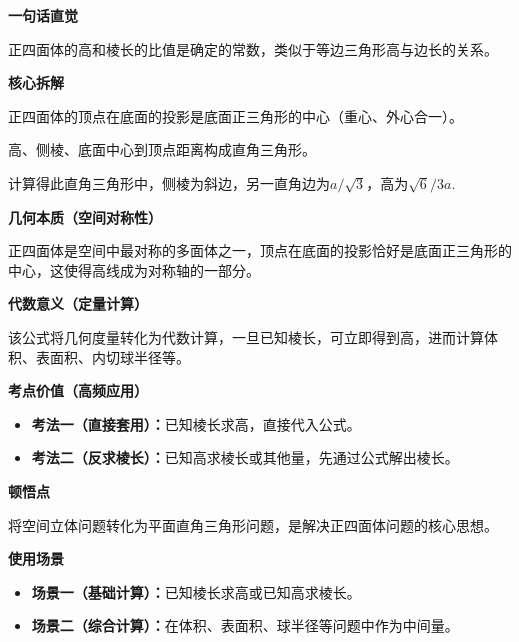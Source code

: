 \begin{explanationbox}
	\textbf{\textcolor{CExplanation}{一句话直觉}}

	正四面体的高和棱长的比值是确定的常数，类似于等边三角形高与边长的关系。

	\medskip
	\textbf{\textcolor{CExplanation}{核心拆解}}
	\begin{description}[style=nextline, leftmargin=2.8em, labelsep=0.5em, itemsep=0.45em]
		\item[\textbf{要点一（底面中心定位）：}]正四面体的顶点在底面的投影是底面正三角形的中心（重心、外心合一）。
		\item[\textbf{要点二（直角三角形勾股）：}]高、侧棱、底面中心到顶点距离构成直角三角形。
		\item[\textbf{要点三（比例定值）：}]计算得此直角三角形中，侧棱为斜边，另一直角边为$a/\sqrt{3}$，高为$\sqrt{6}/3 a$.
	\end{description}

	\medskip
	\textbf{\textcolor{CExplanation}{几何本质（空间对称性）}}

	正四面体是空间中最对称的多面体之一，顶点在底面的投影恰好是底面正三角形的中心，这使得高线成为对称轴的一部分。

	\medskip
	\textbf{\textcolor{CExplanation}{代数意义（定量计算）}}

	该公式将几何度量转化为代数计算，一旦已知棱长，可立即得到高，进而计算体积、表面积、内切球半径等。

	\medskip
	\textbf{\textcolor{CExplanation}{考点价值（高频应用）}}
	\begin{itemize}[leftmargin=*, itemsep=0.5em, topsep=0.4em]
		\item \textbf{考法一（直接套用）：}已知棱长求高，直接代入公式。
		\item \textbf{考法二（反求棱长）：}已知高求棱长或其他量，先通过公式解出棱长。
	\end{itemize}

	\medskip
	\textbf{\textcolor{CExplanation}{顿悟点}}

	将空间立体问题转化为平面直角三角形问题，是解决正四面体问题的核心思想。

	\medskip
	\textbf{\textcolor{CExplanation}{使用场景}}
	\begin{itemize}[leftmargin=*, itemsep=0.5em, topsep=0.4em]
		\item \textbf{场景一（基础计算）：}已知棱长求高或已知高求棱长。
		\item \textbf{场景二（综合计算）：}在体积、表面积、球半径等问题中作为中间量。
	\end{itemize}
\end{explanationbox}
